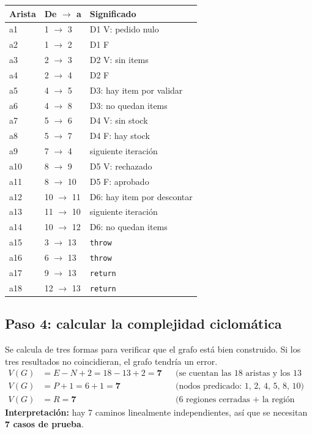 \documentclass[11pt,a4paper,oneside]{report}
\newcommand{\code}[1]{\texttt{#1}}
\begin{document}
\begin{minipage}[t]{0.48\linewidth}
\vspace{0pt}
\scriptsize
\begin{tabular}{@{}lll@{}}
\toprule
\textbf{Arista} & \textbf{De $\rightarrow$ a} & \textbf{Significado}\\
\midrule
a1 & 1 $\rightarrow$ 3 & D1 V: pedido nulo\\
a2 & 1 $\rightarrow$ 2 & D1 F\\
a3 & 2 $\rightarrow$ 3 & D2 V: sin items\\
a4 & 2 $\rightarrow$ 4 & D2 F\\
a5 & 4 $\rightarrow$ 5 & D3: hay item por validar\\
a6 & 4 $\rightarrow$ 8 & D3: no quedan items\\
a7 & 5 $\rightarrow$ 6 & D4 V: sin stock\\
a8 & 5 $\rightarrow$ 7 & D4 F: hay stock\\
a9 & 7 $\rightarrow$ 4 & siguiente iteración\\
a10 & 8 $\rightarrow$ 9 & D5 V: rechazado\\
a11 & 8 $\rightarrow$ 10 & D5 F: aprobado\\
a12 & 10 $\rightarrow$ 11 & D6: hay item por descontar\\
a13 & 11 $\rightarrow$ 10 & siguiente iteración\\
a14 & 10 $\rightarrow$ 12 & D6: no quedan items\\
a15 & 3 $\rightarrow$ 13 & \code{throw}\\
a16 & 6 $\rightarrow$ 13 & \code{throw}\\
a17 & 9 $\rightarrow$ 13 & \code{return}\\
a18 & 12 $\rightarrow$ 13 & \code{return}\\
\bottomrule
\end{tabular}
\end{minipage}

\subsection{Paso 4: calcular la complejidad ciclomática}
Se calcula de tres formas para verificar que el grafo está bien construido. Si los tres resultados no coincidieran, el grafo tendría un error.
\begin{align*}
  V(G) &= E - N + 2 = 18 - 13 + 2 = \mathbf{7} && \text{(se cuentan las 18 aristas y los 13 nodos)}\\
  V(G) &= P + 1 = 6 + 1 = \mathbf{7} && \text{(nodos predicado: 1, 2, 4, 5, 8, 10)}\\
  V(G) &= R = \mathbf{7} && \text{(6 regiones cerradas + la región exterior)}
\end{align*}
\textbf{Interpretación:} hay 7 caminos linealmente independientes, así que se necesitan \textbf{7 casos de prueba}.
\end{document}
